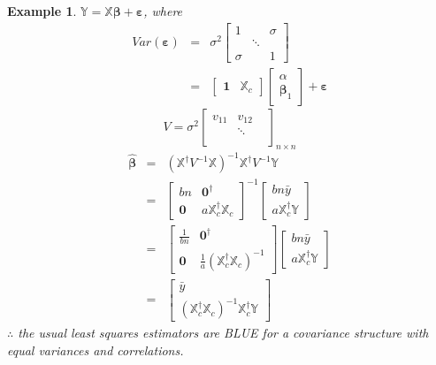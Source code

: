 \documentclass{article}
\newtheorem{example}[theorem]{Example}
\begin{document}
\begin{example}
$\mathbb{Y}=\mathbb{X}\boldsymbol{\beta }+\boldsymbol{\varepsilon }$, where%
\begin{eqnarray*}
Var\left( \boldsymbol{\varepsilon }\right)  &=&\sigma ^{2}\left[ 
\begin{array}{ccc}
1 &  & \sigma  \\ 
& \ddots  &  \\ 
\sigma  &  & 1%
\end{array}%
\right]  \\
&=&\left[ 
\begin{array}{cc}
\boldsymbol{1} & \mathbb{X}_{c}%
\end{array}%
\right] \left[ 
\begin{array}{c}
\alpha  \\ 
\boldsymbol{\beta }_{1}%
\end{array}%
\right] +\boldsymbol{\varepsilon }
\end{eqnarray*}%
\begin{equation*}
V=\sigma ^{2}\left[ 
\begin{array}{ccc}
v_{11} & v_{12} &  \\ 
& \ddots  &  \\ 
&  & 
\end{array}%
\right] _{n\times n}
\end{equation*}%
\begin{eqnarray*}
\boldsymbol{\hat{\beta}} &=&\left( \mathbb{X}^{\dagger }V^{-1}\mathbb{X}%
\right) ^{-1}\mathbb{X}^{\dagger }V^{-1}\mathbb{Y} \\
&=&\left[ 
\begin{array}{cc}
bn & \boldsymbol{0}^{\dagger } \\ 
\boldsymbol{0} & a\mathbb{X}_{c}^{\dagger }\mathbb{X}_{c}%
\end{array}%
\right] ^{-1}\left[ 
\begin{array}{c}
bn\bar{y} \\ 
a\mathbb{X}_{c}^{\dagger }\mathbb{Y}%
\end{array}%
\right]  \\
&=&\left[ 
\begin{array}{cc}
\frac{1}{bn} & \boldsymbol{0}^{\dagger } \\ 
\boldsymbol{0} & \frac{1}{a}\left( \mathbb{X}_{c}^{\dagger }\mathbb{X}%
_{c}\right) ^{-1}%
\end{array}%
\right] \left[ 
\begin{array}{c}
bn\bar{y} \\ 
a\mathbb{X}_{c}^{\dagger }\mathbb{Y}%
\end{array}%
\right]  \\
&=&\left[ 
\begin{array}{c}
\bar{y} \\ 
\left( \mathbb{X}_{c}^{\dagger }\mathbb{X}_{c}\right) ^{-1}\mathbb{X}%
_{c}^{\dagger }\mathbb{Y}%
\end{array}%
\right] 
\end{eqnarray*}%
$\therefore $ the usual least squares estimators are BLUE for a covariance
structure with equal variances and correlations.
\end{example}
\end{document}
